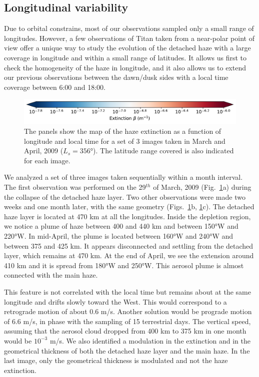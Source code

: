 \subsection{Longitudinal variability}

Due to orbital constrains, most of our observations sampled only a small range of longitudes.
However, a few observations of Titan taken from a near-polar point of view offer a unique way to study the evolution of
the detached haze with a large coverage in longitude and within a small range of latitudes. It allows us
first to check the homogeneity of the haze in longitude, and it also allows us to extend our previous
observations between the dawn/dusk sides with a local time coverage between 6:00 and 18:00.

\begin{figure}[!ht]
\includegraphics[width=.5\textwidth]{Fig/Extinction_colorbar}
\caption{The panels show the map of the haze extinction as a function of longitude and local
time for a set of 3 images taken in March and April, 2009 ($L_s=\ang{356}$). The latitude range covered is
also indicated for each image.}
\label{fig:lon_variability}
\end{figure}

We analyzed a set of three images taken sequentially within a month interval. The first observation
was performed on the 29$^{th}$ of March, 2009 (Fig.~\ref{fig:lon_variability}a) during the collapse of the detached
haze layer. Two other observations were made two weeks and one month later, with the same geometry
(Figs.~\ref{fig:lon_variability}b, \ref{fig:lon_variability}c). The detached haze layer is
located at 470 km at all the longitudes. Inside the depletion region, we notice a plume of haze
between 400 and 440 km and between \ang{150}W and \ang{220}W. In mid-April, the plume is located between
\ang{160}W and \ang{240}W and between 375 and 425 km. It appears disconnected and settling from the detached
layer, which remains at 470 km. At the end of April, we see the extension around 410 km and it
is spread from \ang{180}W and \ang{250}W. This aerosol plume is almost connected with the main haze.

This feature is not correlated with the local time but remains about at the same longitude and drifts slowly
toward the West. This would correspond to a retrograde motion of about 0.6 m/s. Another solution would be
prograde motion of 6.6 m/s, in phase with the sampling of 15 terrestrial days. The vertical speed, assuming
that the aerosol cloud dropped from 400 km to 375 km in one month would be $10^{-3}$ m/s. We also identified a
modulation in the extinction and in the geometrical thickness of both the detached haze layer and the main
haze. In the last image, only the geometrical thickness is modulated and not the haze extinction.

